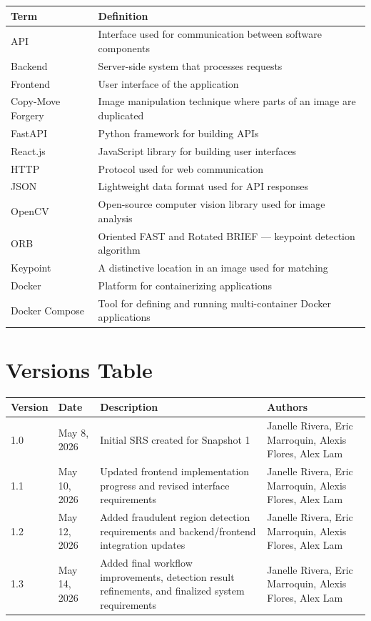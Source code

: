 \documentclass[12pt]{article}
\begin{document}
\begin{longtable}{|p{4cm}|p{9cm}|}
\hline
\textbf{Term} & \textbf{Definition} \\
\hline
API & Interface used for communication between software components \\
\hline
Backend & Server-side system that processes requests \\
\hline
Frontend & User interface of the application \\
\hline
Copy-Move Forgery & Image manipulation technique where parts of an image are duplicated \\
\hline
FastAPI & Python framework for building APIs \\
\hline
React.js & JavaScript library for building user interfaces \\
\hline
HTTP & Protocol used for web communication \\
\hline
JSON & Lightweight data format used for API responses \\
\hline
OpenCV & Open-source computer vision library used for image analysis \\
\hline
ORB & Oriented FAST and Rotated BRIEF --- keypoint detection algorithm \\
\hline
Keypoint & A distinctive location in an image used for matching \\
\hline
Docker & Platform for containerizing applications \\
\hline
Docker Compose & Tool for defining and running multi-container Docker applications \\
\hline
\end{longtable}

\section{Versions Table}

\begin{longtable}{|p{1.5cm}|p{2.5cm}|p{5.5cm}|p{4cm}|}
\hline
\textbf{Version} & \textbf{Date} & \textbf{Description} & \textbf{Authors} \\
\hline
1.0 & May 8, 2026 & Initial SRS created for Snapshot 1 & Janelle Rivera, Eric Marroquin, Alexis Flores, Alex Lam \\
\hline
1.1 & May 10, 2026 & Updated frontend implementation progress and revised interface requirements & Janelle Rivera, Eric Marroquin, Alexis Flores, Alex Lam \\
\hline
1.2 & May 12, 2026 & Added fraudulent region detection requirements and backend/frontend integration updates & Janelle Rivera, Eric Marroquin, Alexis Flores, Alex Lam \\
\hline
1.3 & May 14, 2026 & Added final workflow improvements, detection result refinements, and finalized system requirements & Janelle Rivera, Eric Marroquin, Alexis Flores, Alex Lam \\
\hline
\end{longtable}
\end{document}

